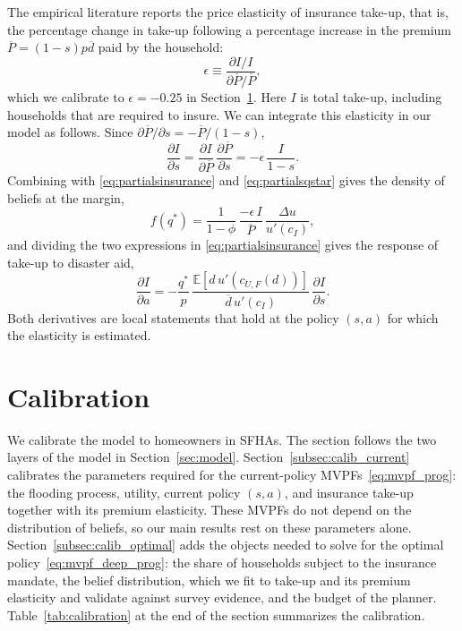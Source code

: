 \documentclass[12pt]{article}
\begin{document}
The empirical literature reports the price elasticity of insurance take-up, that is, the percentage change in take-up following a percentage increase in the premium $\overline{P}=(1-s)p\overline{d}$ paid by the household:
\begin{equation}
\epsilon\equiv\frac{\partial I/I}{\partial\overline{P}/\overline{P}},
\end{equation}
which we calibrate to $\epsilon=-0.25$ in Section~\ref{sec:calibration}. Here $I$ is total take-up, including households that are required to insure. We can integrate this elasticity in our model as follows. Since $\partial \overline{P}/\partial s=-\overline{P}/(1-s)$,
\begin{equation}\label{eq:insurancedemandwrts}
\frac{\partial I}{\partial s}=\frac{\partial I}{\partial \overline{P}}\,\frac{\partial \overline{P}}{\partial s}=-\epsilon\,\frac{I}{1-s}.
\end{equation}
Combining with \eqref{eq:partialsinsurance} and \eqref{eq:partialsqstar} gives the density of beliefs at the margin,
\begin{equation}\label{eq:fqstar}
f(q^*)=\frac{1}{1-\phi}\,\frac{-\epsilon\, I}{\overline{P}}\,\frac{\Delta u}{u'(c_I)},
\end{equation}
and dividing the two expressions in \eqref{eq:partialsinsurance} gives the response of take-up to disaster aid,
\begin{equation}\label{eq:insurancedemandwrta}
\frac{\partial I}{\partial a}=-\frac{q^*}{p}\,\frac{\mathbb{E}[d\,u'(c_{U,F}(d))]}{\overline{d}\,u'(c_I)}\,\frac{\partial I}{\partial s}.
\end{equation}
Both derivatives are local statements that hold at the policy $(s,a)$ for which the elasticity is estimated.

\section{Calibration}
\label{sec:calibration}

We calibrate the model to homeowners in SFHAs. The section follows the two layers of the model in Section~\ref{sec:model}. Section~\ref{subsec:calib_current} calibrates the parameters required for the current-policy MVPFs~\eqref{eq:mvpf_prog}: the flooding process, utility, current policy $(s,a)$, and insurance take-up together with its premium elasticity. These MVPFs do not depend on the distribution of beliefs, so our main results rest on these parameters alone. Section~\ref{subsec:calib_optimal} adds the objects needed to solve for the optimal policy~\eqref{eq:mvpf_deep_prog}: the share of households subject to the insurance mandate, the belief distribution, which we fit to take-up and its premium elasticity and validate against survey evidence, and the budget of the planner. Table~\ref{tab:calibration} at the end of the section summarizes the calibration.
\end{document}
